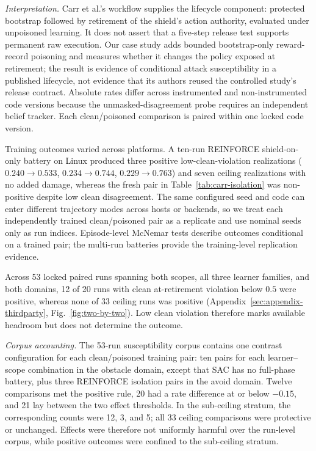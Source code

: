 \emph{Interpretation.}
Carr et al.'s workflow supplies the lifecycle component: protected bootstrap
followed by retirement of the shield's action authority, evaluated under
unpoisoned learning.  It does not assert that a five-step release test supports
permanent raw execution.  Our case study adds bounded bootstrap-only
reward-record poisoning and measures whether it changes the policy exposed at
retirement; the result is evidence of conditional attack susceptibility in a
published lifecycle, not evidence that its authors reused the controlled
study's release contract.  Absolute rates differ across
instrumented and non-instrumented code versions because the
unmasked-disagreement probe requires an independent belief tracker.  Each
clean/poisoned comparison is paired within one locked code version.

Training outcomes varied across platforms.  A ten-run REINFORCE
shield-on-only battery on Linux produced three positive low-clean-violation
realizations ($0.240\rightarrow0.533$, $0.234\rightarrow0.744$,
$0.229\rightarrow0.763$) and seven ceiling realizations with no added damage,
whereas the fresh pair in Table~\ref{tab:carr-isolation} was non-positive
despite low clean disagreement.  The same configured seed and code can enter
different trajectory modes across hosts or backends, so we treat each
independently trained clean/poisoned pair as a replicate and use nominal seeds
only as run indices.  Episode-level McNemar tests describe outcomes
conditional on a trained pair; the multi-run batteries provide the
training-level replication evidence.

Across 53 locked paired runs spanning both scopes, all three learner families,
and both domains, 12 of 20 runs with clean at-retirement violation below $0.5$
were positive, whereas none of 33 ceiling runs was positive
(Appendix~\ref{sec:appendix-thirdparty}, Fig.~\ref{fig:two-by-two}).  Low
clean violation therefore marks available headroom but does not determine the
outcome.

\emph{Corpus accounting.}  The 53-run susceptibility corpus contains one
contrast configuration for each clean/poisoned training pair: ten pairs for
each learner--scope combination in the obstacle domain, except that SAC has no
full-phase battery, plus three REINFORCE isolation pairs in the avoid domain.
Twelve comparisons met the positive rule, 20 had a rate difference at or below
$-0.15$, and 21 lay between the two effect thresholds.  In the sub-ceiling
stratum, the corresponding counts were 12, 3, and 5; all 33 ceiling
comparisons were protective or unchanged.  Effects were therefore not
uniformly harmful over the run-level corpus, while positive outcomes were
confined to the sub-ceiling stratum.

